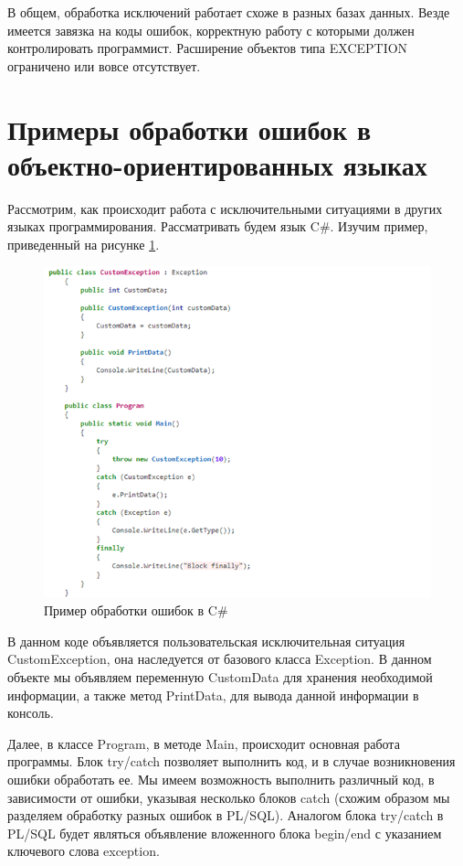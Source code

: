 В общем, обработка исключений работает схоже в разных базах данных. Везде имеется завязка на коды ошибок, корректную работу с которыми должен контролировать программист. Расширение объектов типа EXCEPTION ограничено или вовсе отсутствует. 

\section{Примеры обработки ошибок в объектно-ориентированных языках}\label{ch2:sec4}

Рассмотрим, как происходит работа с исключительными ситуациями в других языках программирования. Рассматривать будем язык C\#. Изучим пример, приведенный на рисунке \ref{fig:C2_c_sharp_user_defined_exceptions}. 

\begin{figure}[ht!] 
	\center
	\includegraphics [scale=1] {my_folder/img/C2_c_sharp_user_defined_exceptions}
	\caption{Пример обработки ошибок в C\#} 
	\label{fig:C2_c_sharp_user_defined_exceptions}  
\end{figure}
\FloatBarrier

В данном коде объявляется пользовательская исключительная ситуация CustomException, она наследуется от базового класса Exception. В данном объекте мы объявляем переменную CustomData для хранения необходимой информации, а также метод PrintData, для вывода данной информации в консоль. 

Далее, в классе Program, в методе Main, происходит основная работа программы. Блок try/catch позволяет выполнить код, и в случае возникновения ошибки обработать ее. Мы имеем возможность выполнить различный код, в зависимости от ошибки, указывая несколько блоков catch (схожим образом мы разделяем обработку разных ошибок в PL/SQL). Аналогом блока try/catch в PL/SQL будет являться объявление вложенного блока begin/end с указанием ключевого слова exception. 

